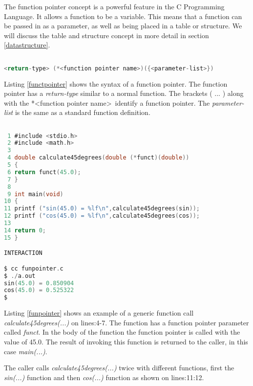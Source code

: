 
The function pointer concept is a powerful feature in the C Programming Language. It allows a function to be a variable. This means that a function can be passed in as a parameter, as well as being placed in a table or structure. We will discuss the table and structure concept in more detail in section \ref{datastructure}.
 
\begin{lstlisting}[language=C,caption={Function Pointer Syntax},captionpos=b,label=functpointer]

<return-type> (*<function pointer name>)({<parameter-list>})

\end{lstlisting}

Listing \ref{functpointer} shows the syntax of a function pointer. The function pointer has a \textit{return-type} similar to a normal function. The brackets ( ... ) along with the *\textless{function pointer name}\textgreater \, identify a function pointer. The \textit{parameter-list} is the same as a standard function definition. 

\begin{lstlisting}[language=C,showstringspaces=false,caption={File: funpointer.c},captionpos=b,label=funpointer]

 1 #include <stdio.h>
 2 #include <math.h>
 3 
 4 double calculate45degrees(double (*funct)(double))
 5 {
 6 return funct(45.0);
 7 }
 8 
 9 int main(void)
10 {
11 printf ("sin(45.0) = %lf\n",calculate45degrees(sin));
12 printf ("cos(45.0) = %lf\n",calculate45degrees(cos));
13 
14 return 0;
15 }

INTERACTION

$ cc funpointer.c
$ ./a.out
sin(45.0) = 0.850904
cos(45.0) = 0.525322
$

\end{lstlisting}


Listing \ref{funpointer} shows an example of a generic function call \textit{calculate45degrees(...)} on lines:4-7. The function has a function pointer parameter called \textit{funct}. In the body of the function the function pointer is called with the value of 45.0. The result of invoking this function is returned to the caller, in this case \textit{main(...)}. 

The caller calls \textit{calculate45degrees(...)} twice with different functions, first the \textit{sin(...)} function and then \textit{cos(...)} function as shown on lines:11:12.


